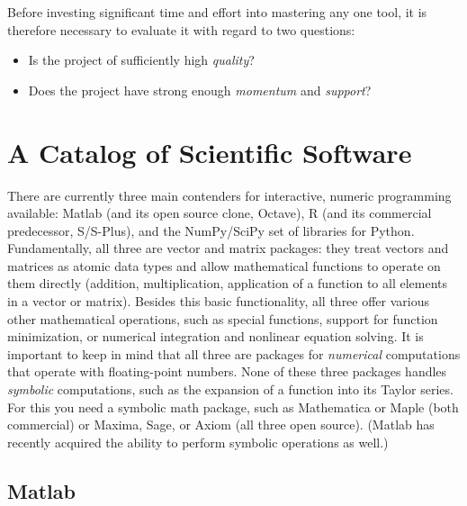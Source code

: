 Before investing significant time and effort into mastering any one
tool, it is therefore necessary to evaluate it with regard to two
questions:

\begin{itemize}
\item Is the project of sufficiently high \emph{quality}?
\item Does the project have strong enough \emph{momentum} and
  \emph{support}?\vspace*{-9pt}
\end{itemize}

\section{A Catalog of Scientific Software}

There are currently three main contenders for interactive, numeric
programming available: Matlab (and its open source clone, Octave), R
(and its commercial predecessor, S/S-Plus), and the NumPy/SciPy set of
libraries for Python. Fundamentally, all three are vector and matrix
packages: they treat vectors and matrices as atomic data types and
allow mathematical functions to operate on them directly (addition,
multiplication, application of a function to all elements in a vector
or matrix). Besides this basic functionality, all three offer various
other mathematical operations, such as special functions, support for
function minimization, or numerical integration and nonlinear equation
solving. It is important to keep in mind that all three are packages
for \emph{numerical} computations that operate with floating-point
numbers. None of these three packages handles \emph{symbolic}
computations, such as the expansion of a function into its Taylor
series. For this you need a symbolic math package, such as
Mathematica or Maple (both commercial) or Maxima, Sage, or Axiom (all
three open source). (Matlab has recently acquired the ability to
perform symbolic operations as well.)


\vspace*{-6pt}
\subsection{Matlab}

